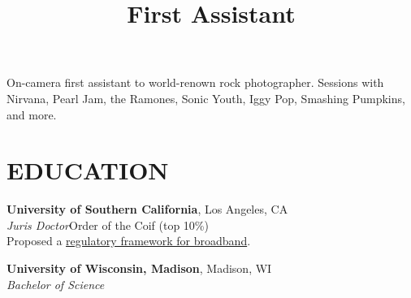 \documentclass[margin]{res}
\begin{document}
\begin{resume}
\title{\textbf{First Assistant}}
\begin{position}
\hspace*{.5cm}On-camera first assistant to world-renown rock photographer. Sessions with Nirvana, Pearl Jam, the Ramones, Sonic Youth, Iggy Pop, Smashing Pumpkins, and more.
\end{position}


\section{EDUCATION}

\textbf{University of Southern California}, Los Angeles, CA\\
{\sl Juris Doctor}\hfill Order of the Coif
(top 10\%)
\\
  Proposed a \href{https://hero.net/public/Triple_Play.pdf}{regulatory framework for broadband}.

\textbf{University of Wisconsin, Madison}, Madison, WI\\
{\sl Bachelor of Science}

\end{resume}
\end{document}
